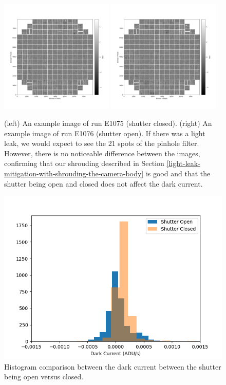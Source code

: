 \begin{figure}[ht]
\begin{centering}
\includegraphics[width=0.48\textwidth]{figures/E1075_ShutterClosed.png}
\includegraphics[width=0.48\textwidth]{figures/E1076_ShutterOpen.png}
\caption{ (left) An example image of run E1075 (shutter closed). (right) An example image of run E1076 (shutter open). If there was a light leak, we would expect to see the 21 spots of the pinhole filter. However, there is no noticeable difference between the images, confirming that our shrouding described in Section \ref{light-leak-mitigation-with-shrouding-the-camera-body} is good and that the shutter being open and closed does not affect the dark current. \label{fig:shutter-darkcurrent}}
\end{centering}
\end{figure}

\begin{figure}[ht]
    \centering
    \includegraphics[width=0.5\linewidth]{figures/DarkCurrent_ShutterOpenvClosed.png}
    \caption{Histogram comparison between the dark current between the shutter being open versus closed.}
    \label{fig:DarkCurrent_ShutterOpenvClosed}
\end{figure}

